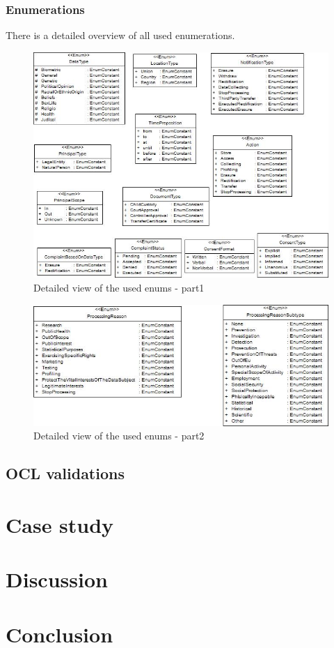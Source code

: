 \documentclass[11pt,english]{article}
\begin{document}
\subsubsection{Enumerations}
There is a detailed overview of all used enumerations.
\begin{figure}[H]
    \centering
    \includegraphics[width=12.5cm]{images/enums1.jpg}
    \caption{Detailed view of the used enums - part1}
    \label{fig:Enums1}
\end{figure}
\begin{figure}[H]
    \centering
    \includegraphics[width=12.5cm]{images/enums2.jpg}
    \caption{Detailed view of the used enums - part2}
    \label{fig:Enums2}
\end{figure}
\subsection{OCL validations}
\section{Case study}
\section{Discussion}
\section{Conclusion}
\printbibliography
\end{document}
